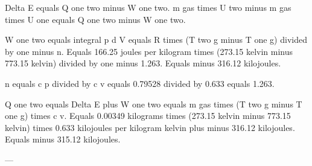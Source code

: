 Delta E equals Q one two minus W one two.  
m gas times U two minus m gas times U one equals Q one two minus W one two.  

W one two equals integral p d V equals R times (T two g minus T one g) divided by one minus n.  
Equals 166.25 joules per kilogram times (273.15 kelvin minus 773.15 kelvin) divided by one minus 1.263.  
Equals minus 316.12 kilojoules.  

n equals c p divided by c v equals 0.79528 divided by 0.633 equals 1.263.  

Q one two equals Delta E plus W one two equals m gas times (T two g minus T one g) times c v.  
Equals 0.00349 kilograms times (273.15 kelvin minus 773.15 kelvin) times 0.633 kilojoules per kilogram kelvin plus minus 316.12 kilojoules.  
Equals minus 315.12 kilojoules.  

---